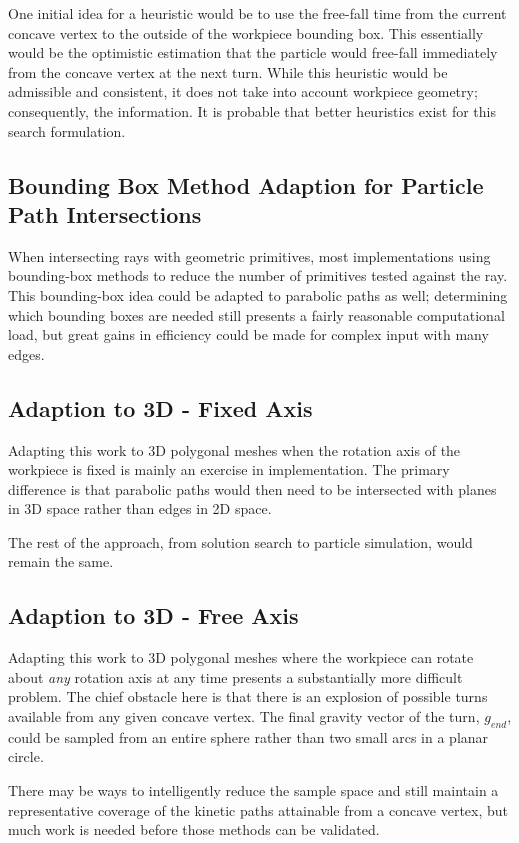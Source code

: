 One initial idea for a heuristic would be to use the free-fall time from the current concave vertex to the outside of the workpiece bounding box. This essentially would be the optimistic estimation that the particle would free-fall immediately from the concave vertex at the next turn. While this heuristic would be admissible and consistent, it does not take into account workpiece geometry; consequently, the information. It is probable that better heuristics exist for this search formulation.

  \subsection{Bounding Box Method Adaption for Particle Path Intersections}

When intersecting rays with geometric primitives, most implementations using bounding-box methods to reduce the number of primitives tested against the ray. This bounding-box idea could be adapted to parabolic paths as well; determining which bounding boxes are needed still presents a fairly reasonable computational load, but great gains in efficiency could be made for complex input with many edges.

  \subsection{Adaption to 3D - Fixed Axis}

Adapting this work to 3D polygonal meshes when the rotation axis of the workpiece is fixed is mainly an exercise in implementation. The primary difference is that parabolic paths would then need to be intersected with planes in 3D space rather than edges in 2D space.

The rest of the approach, from solution search to particle simulation, would remain the same.

  \subsection{Adaption to 3D - Free Axis}

Adapting this work to 3D polygonal meshes where the workpiece can rotate about \emph{any} rotation axis at any time presents a substantially more difficult problem. The chief obstacle here is that there is an explosion of possible turns available from any given concave vertex. The final gravity vector of the turn, $g_{end}$, could be sampled from an entire sphere rather than two small arcs in a planar circle.

There may be ways to intelligently reduce the sample space and still maintain a representative coverage of the kinetic paths attainable from a concave vertex, but much work is needed before those methods can be validated.

